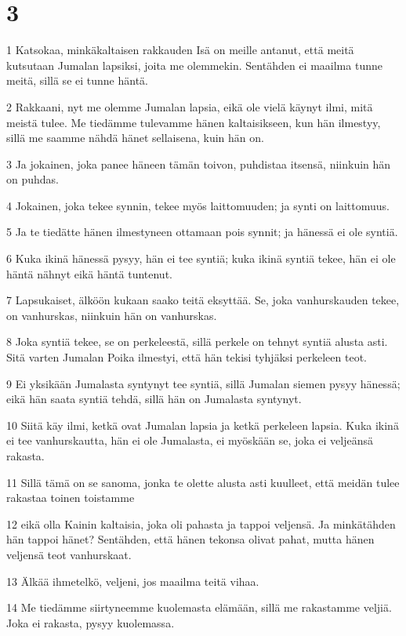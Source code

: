\chapter{3}

\par 1 Katsokaa, minkäkaltaisen rakkauden Isä on meille antanut, että meitä kutsutaan Jumalan lapsiksi, joita me olemmekin. Sentähden ei maailma tunne meitä, sillä se ei tunne häntä.
\par 2 Rakkaani, nyt me olemme Jumalan lapsia, eikä ole vielä käynyt ilmi, mitä meistä tulee. Me tiedämme tulevamme hänen kaltaisikseen, kun hän ilmestyy, sillä me saamme nähdä hänet sellaisena, kuin hän on.
\par 3 Ja jokainen, joka panee häneen tämän toivon, puhdistaa itsensä, niinkuin hän on puhdas.
\par 4 Jokainen, joka tekee synnin, tekee myös laittomuuden; ja synti on laittomuus.
\par 5 Ja te tiedätte hänen ilmestyneen ottamaan pois synnit; ja hänessä ei ole syntiä.
\par 6 Kuka ikinä hänessä pysyy, hän ei tee syntiä; kuka ikinä syntiä tekee, hän ei ole häntä nähnyt eikä häntä tuntenut.
\par 7 Lapsukaiset, älköön kukaan saako teitä eksyttää. Se, joka vanhurskauden tekee, on vanhurskas, niinkuin hän on vanhurskas.
\par 8 Joka syntiä tekee, se on perkeleestä, sillä perkele on tehnyt syntiä alusta asti. Sitä varten Jumalan Poika ilmestyi, että hän tekisi tyhjäksi perkeleen teot.
\par 9 Ei yksikään Jumalasta syntynyt tee syntiä, sillä Jumalan siemen pysyy hänessä; eikä hän saata syntiä tehdä, sillä hän on Jumalasta syntynyt.
\par 10 Siitä käy ilmi, ketkä ovat Jumalan lapsia ja ketkä perkeleen lapsia. Kuka ikinä ei tee vanhurskautta, hän ei ole Jumalasta, ei myöskään se, joka ei veljeänsä rakasta.
\par 11 Sillä tämä on se sanoma, jonka te olette alusta asti kuulleet, että meidän tulee rakastaa toinen toistamme
\par 12 eikä olla Kainin kaltaisia, joka oli pahasta ja tappoi veljensä. Ja minkätähden hän tappoi hänet? Sentähden, että hänen tekonsa olivat pahat, mutta hänen veljensä teot vanhurskaat.
\par 13 Älkää ihmetelkö, veljeni, jos maailma teitä vihaa.
\par 14 Me tiedämme siirtyneemme kuolemasta elämään, sillä me rakastamme veljiä. Joka ei rakasta, pysyy kuolemassa.
